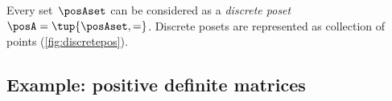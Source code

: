 \begin{example}
    \label{ex:discreteposet}
    Every set~$\posAset$ can be considered as a \emph{discrete poset}~$\posA = \tup{\posAset,=}$.
    Discrete posets are represented as collection of points (\cref{fig:discretepos}).
\end{example}

\newcommand{\fitinmargin}[1]{%
    \maxsizebox{\marginparwidth}{!}{#1}%
}

\newcommand{\fitinline}[1]{%
    \maxsizebox{\textwidth}{!}{#1}%
}

\vfill\clearpage

\subsection{Example: positive definite matrices}

\begin{marginfigure}
    \centering

    \caption{}
    \label{fig:posdef}
\end{marginfigure}

